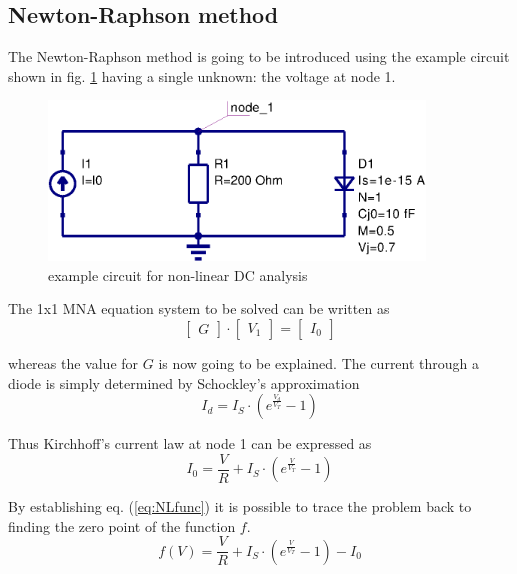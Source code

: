 \subsection{Newton-Raphson method}
\label{sec:NRmethod}

The Newton-Raphson method is going to be introduced using the example
circuit shown in fig. \ref{fig:NLexample} having a single unknown: the
voltage at node 1.

\begin{figure}[ht]
\begin{center}
\includegraphics[width=10cm]{NLexample}
\end{center}
\caption{example circuit for non-linear DC analysis}
\label{fig:NLexample}
\end{figure}
\FloatBarrier

The 1x1 MNA equation system to be solved can be written as
\begin{equation}
\begin{bmatrix}
G
\end{bmatrix}
\cdot
\begin{bmatrix}
V_{1}
\end{bmatrix}
=
\begin{bmatrix}
I_{0}
\end{bmatrix}
\label{eq:NLmatrix}
\end{equation}

whereas the value for $G$ is now going to be explained.  The current
through a diode is simply determined by Schockley's approximation
\begin{equation}
I_{d} = I_{S}\cdot \left(e^{\frac{V_{d}}{V_{T}}} - 1\right)
\end{equation}

Thus Kirchhoff's current law at node 1 can be expressed as
\begin{equation}
I_{0} = \dfrac{V}{R} + I_{S}\cdot \left(e^{\frac{V}{V_{T}}} - 1\right)
\end{equation}

By establishing eq. (\ref{eq:NLfunc}) it is possible to trace the
problem back to finding the zero point of the function $f$.
\begin{equation}
f(V) = \dfrac{V}{R} + I_{S}\cdot \left(e^{\frac{V}{V_{T}}} - 1\right) - I_{0}
\label{eq:NLfunc}
\end{equation}

